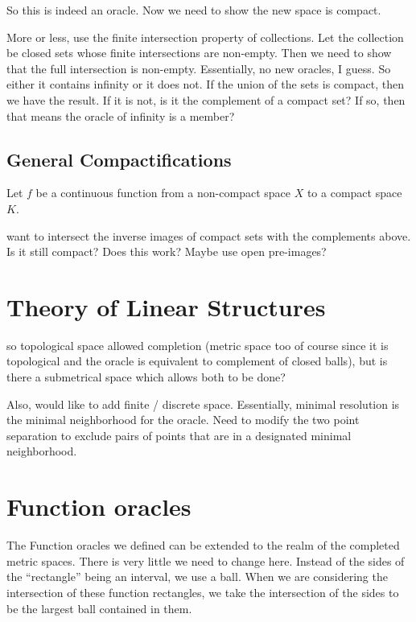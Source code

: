 \documentclass[12pt]{article}
\begin{document}
So this is indeed an oracle. Now we need to show the new space is compact. 

More or less, use the finite intersection property of collections. Let the collection be closed sets whose finite intersections are non-empty. Then we need to show that the full intersection is non-empty. Essentially, no new oracles, I guess. So either it contains infinity or it does not. If the union of the sets is compact, then we have the result. If it is not, is it the complement of a compact set? If so, then that means the oracle of infinity is a member? 

\subsection{General Compactifications}

Let $f$ be a continuous function from a non-compact space $X$ to a compact space $K$. 

want to intersect the inverse images of compact sets with the complements above. Is it still compact? Does this work? Maybe use open pre-images? 

\section{Theory of Linear Structures}

so topological space allowed completion (metric space too of course since it is topological and the oracle is equivalent to complement of closed balls),  but is there a submetrical space which allows both to be done? 

Also, would like to add finite / discrete space. Essentially, minimal resolution is the minimal neighborhood for the oracle. Need to modify the two point separation to exclude pairs of points that are in a designated minimal neighborhood. 





\section{Function oracles}



The Function oracles we defined can be extended to the realm of the completed metric spaces. There is very little we need to change here. Instead of the sides of the ``rectangle'' being an interval, we use a ball. When we are considering the intersection of these function rectangles, we take the intersection of the sides to be the largest ball contained in them. 
\end{document}
